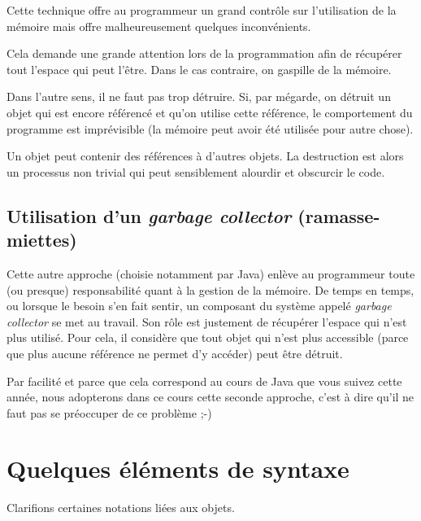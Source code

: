 		Cette technique offre au programmeur un grand contrôle sur l’utilisation
		de la mémoire mais offre malheureusement quelques inconvénients.
	
		\begin{liste}
			\item 
				Cela demande une grande attention lors de la programmation afin de
				récupérer tout l’espace qui peut l’être. Dans le cas contraire, on
				gaspille de la mémoire.
			\item 
				Dans l’autre sens, il ne faut pas trop détruire. Si, par mégarde, on
				détruit un objet qui est encore référencé et qu'on
				utilise cette référence, le comportement du programme est imprévisible
				(la mémoire peut avoir été utilisée pour autre chose).
			\item 
				Un objet peut contenir des références à d’autres objets. La destruction
				est alors un processus non trivial qui peut sensiblement alourdir et
				obscurcir le code.
		\end{liste}
	
	\subsection{Utilisation d’un \textit{garbage collector} (ramasse-miettes)}
	
		Cette autre approche (choisie notamment par Java) enlève au programmeur
		toute (ou presque) responsabilité quant à la gestion de la mémoire. De
		temps en temps, ou lorsque le besoin s’en fait sentir, un composant du
		système appelé \textit{garbage collector} se met au travail. Son rôle
		est justement de récupérer l’espace qui n’est plus utilisé. Pour cela,
		il considère que tout objet qui n'est plus accessible
		(parce que plus aucune référence ne permet d’y accéder) peut être
		détruit.
		
		Par facilité et parce que cela correspond au cours de Java que vous
		suivez cette année, nous adopterons dans ce cours cette seconde
		approche, c'est à dire qu'il ne faut
		pas se préoccuper de ce problème ;-)


\section{Quelques éléments de syntaxe}

	Clarifions certaines notations liées aux objets.

